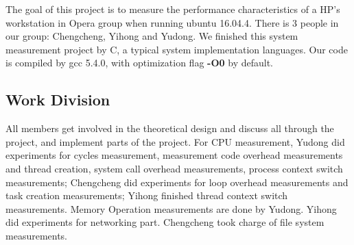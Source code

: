 
The goal of this project is to measure the performance characteristics of a HP's workstation in Opera group when running ubuntu 16.04.4. There is 3 people in our group: Chengcheng, Yihong and Yudong. We finished this system measurement project by C, a typical system implementation languages. Our code is compiled by gcc 5.4.0, with optimization flag \textbf{-O0} by default.

\subsection {Work Division}

All members get involved in the theoretical design and discuss all through the project, and implement parts of the project. For CPU measurement, Yudong did experiments for cycles measurement, measurement code overhead measurements and thread creation,  system call overhead measurements, process context switch measurements; Chengcheng did experiments for loop overhead measurements and task creation measurements; Yihong finished thread context switch measurements. Memory Operation measurements are done by Yudong. Yihong did experiments for networking part. Chengcheng took charge of file system measurements.
